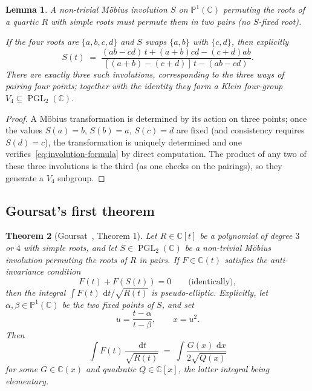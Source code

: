 \documentclass[11pt,a4paper]{article}
\theoremstyle{plain}
\newtheorem{theorem}{Theorem}[section]
\newtheorem{lemma}[theorem]{Lemma}
\theoremstyle{definition}
\theoremstyle{remark}
\newcommand{\C}{\mathbb{C}}
\newcommand{\PGL}{\operatorname{PGL}}
\renewcommand{\d}{\,\mathrm{d}}
\begin{document}
\begin{lemma}\label{lem:involutions-pairs}
A non-trivial M\"obius involution $S$ on $\mathbb{P}^1(\C)$ permuting the roots of a quartic $R$ with simple roots must permute them in two pairs (no $S$-fixed root).

If the four roots are $\{a,b,c,d\}$ and $S$ swaps $\{a,b\}$ with $\{c,d\}$, then explicitly
\begin{equation}\label{eq:involution-formula}
  S(t) \;=\; \frac{(ab-cd)\,t + (a+b)cd - (c+d)ab}{[(a+b)-(c+d)]\,t - (ab-cd)}.
\end{equation}
There are exactly three such involutions, corresponding to the three ways of pairing four points; together with the identity they form a Klein four-group $V_4 \subseteq \PGL_2(\C)$.
\end{lemma}

\begin{proof}
A M\"obius transformation is determined by its action on three points; once the values $S(a)=b$, $S(b)=a$, $S(c)=d$ are fixed (and consistency requires $S(d)=c$), the transformation is uniquely determined and one verifies~\eqref{eq:involution-formula} by direct computation. The product of any two of these three involutions is the third (as one checks on the pairings), so they generate a $V_4$ subgroup.
\end{proof}

\subsection{Goursat's first theorem}

\begin{theorem}[Goursat~\cite{Goursat1887}, Theorem 1]\label{thm:goursat1}
Let $R\in\C[t]$ be a polynomial of degree $3$ or $4$ with simple roots, and let $S\in\PGL_2(\C)$ be a non-trivial M\"obius involution permuting the roots of $R$ in pairs. If $F\in\C(t)$ satisfies the \emph{anti-invariance} condition
\begin{equation}\label{eq:antiinv}
  F(t) + F(S(t)) = 0\qquad \text{(identically)},
\end{equation}
then the integral $\int F(t)\,\d t/\sqrt{R(t)}$ is pseudo-elliptic. Explicitly, let $\alpha,\beta\in\mathbb{P}^1(\C)$ be the two fixed points of $S$, and set
\[
  u = \frac{t-\alpha}{t-\beta},\qquad x = u^2.
\]
Then
\[
  \int F(t)\,\frac{\d t}{\sqrt{R(t)}} \;=\; \int \frac{G(x)\,\d x}{2\sqrt{Q(x)}}
\]
for some $G\in\C(x)$ and quadratic $Q\in\C[x]$, the latter integral being elementary.
\end{theorem}
\end{document}
